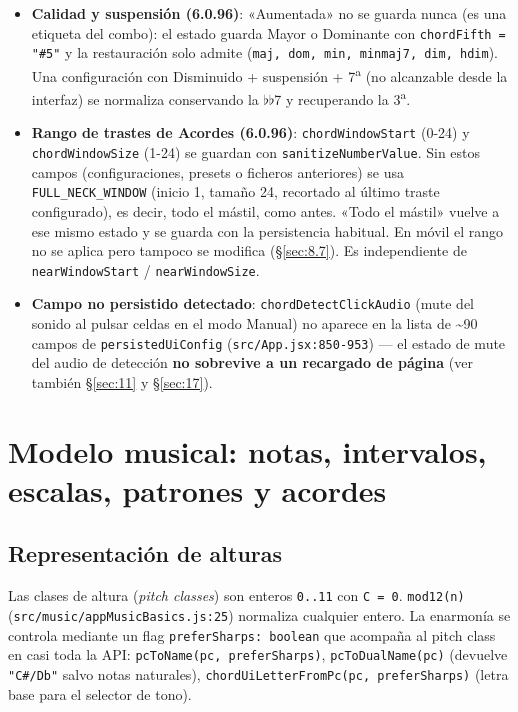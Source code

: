 \documentclass[a4paper,11pt,oneside]{report}
\newcommand{\Sref}[1]{\S\ref{#1}}
\newcommand{\flt}{\ensuremath{\flat}}
\begin{document}
\begin{itemize}
\item \textbf{Calidad y suspensión (6.0.96)}: «Aumentada» no se guarda nunca (es una etiqueta del combo): el estado guarda Mayor o Dominante con \lstinline!chordFifth = "#5"! y la restauración solo admite \texttt{} (\lstinline!maj, dom, min, minmaj7, dim, hdim!). Una configuración con Disminuido + suspensión + 7\textsuperscript{a} (no alcanzable desde la interfaz) se normaliza conservando la \flt\flt7 y recuperando la 3\textsuperscript{a}.
\item \textbf{Rango de trastes de Acordes (6.0.96)}: \lstinline!chordWindowStart! (0-24) y \lstinline!chordWindowSize! (1-24) se guardan con \lstinline!sanitizeNumberValue!. Sin estos campos (configuraciones, presets o ficheros anteriores) se usa \lstinline!FULL_NECK_WINDOW! (inicio 1, tamaño 24, recortado al último traste configurado), es decir, todo el mástil, como antes. «Todo el mástil» vuelve a ese mismo estado y se guarda con la persistencia habitual. En móvil el rango no se aplica pero tampoco se modifica (\Sref{sec:8.7}). Es independiente de \lstinline!nearWindowStart! / \lstinline!nearWindowSize!.
\item \textbf{Campo no persistido detectado}: \lstinline!chordDetectClickAudio! (mute del sonido al pulsar celdas en el modo Manual) no aparece en la lista de \textasciitilde90 campos de \lstinline!persistedUiConfig! (\lstinline!src/App.jsx:850-953!) --- el estado de mute del audio de detección \textbf{no sobrevive a un recargado de página} (ver también \Sref{sec:11} y \Sref{sec:17}).
\end{itemize}

\chapter{Modelo musical: notas, intervalos, escalas, patrones y acordes}
\label{sec:7}

\section{Representación de alturas}
\label{sec:7.1}

Las clases de altura (\textit{pitch classes}) son enteros \lstinline!0..11! con \lstinline!C = 0!. \lstinline!mod12(n)! (\lstinline!src/music/appMusicBasics.js:25!) normaliza cualquier entero. La enarmonía se controla mediante un flag \lstinline!preferSharps: boolean! que acompaña al pitch class en casi toda la API: \lstinline!pcToName(pc, preferSharps)!, \lstinline!pcToDualName(pc)! (devuelve \lstinline!"C#/Db"! salvo notas naturales), \lstinline!chordUiLetterFromPc(pc, preferSharps)! (letra base para el selector de tono).
\end{document}

